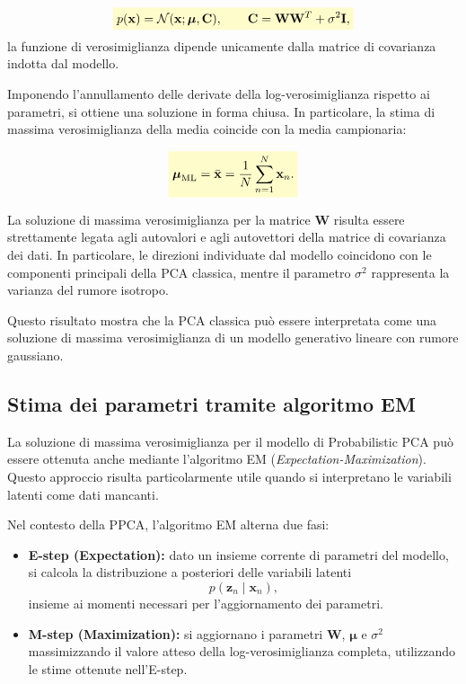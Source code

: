\documentclass[a4paper,12pt]{report}
\newcommand{\highlight}[1]{%
\colorbox{yellow!20}{$\displaystyle #1$}%
}
\begin{document}
\[
\highlight{
p(\mathbf{x}) = \mathcal{N}(\mathbf{x}; \boldsymbol{\mu}, \mathbf{C}),
\qquad
\mathbf{C} = \mathbf{W}\mathbf{W}^T + \sigma^2 \mathbf{I},}
\]
la funzione di verosimiglianza dipende unicamente dalla matrice di covarianza indotta dal modello.

Imponendo l'annullamento delle derivate della log-verosimiglianza rispetto ai parametri, si ottiene una soluzione in forma chiusa. In particolare, la stima di massima verosimiglianza della media coincide con la media campionaria:

\[
\highlight{
\boldsymbol{\mu}_{\text{ML}} = \bar{\mathbf{x}} = \frac{1}{N} \sum_{n=1}^{N} \mathbf{x}_n.}
\]

La soluzione di massima verosimiglianza per la matrice $\mathbf{W}$ risulta essere strettamente legata agli autovalori e agli autovettori della matrice di covarianza dei dati. In particolare, le direzioni individuate dal modello coincidono con le componenti principali della PCA classica, mentre il parametro $\sigma^2$ rappresenta la varianza del rumore isotropo.

Questo risultato mostra che la PCA classica può essere interpretata come una soluzione di massima verosimiglianza di un modello generativo lineare con rumore gaussiano.

\subsection{Stima dei parametri tramite algoritmo EM}

La soluzione di massima verosimiglianza per il modello di Probabilistic PCA può essere ottenuta anche mediante l'algoritmo EM (\emph{Expectation-Maximization}). Questo approccio risulta particolarmente utile quando si interpretano le variabili latenti come dati mancanti.

Nel contesto della PPCA, l'algoritmo EM alterna due fasi:
\begin{itemize}
    \item \textbf{E-step (Expectation):}  
    dato un insieme corrente di parametri del modello, si calcola la distribuzione a posteriori delle variabili latenti
    \[
    p(\mathbf{z}_n \mid \mathbf{x}_n),
    \]
    insieme ai momenti necessari per l'aggiornamento dei parametri.
    
    \item \textbf{M-step (Maximization):}  
    si aggiornano i parametri $\mathbf{W}$, $\boldsymbol{\mu}$ e $\sigma^2$ massimizzando il valore atteso della log-verosimiglianza completa, utilizzando le stime ottenute nell'E-step.
\end{itemize}
\end{document}

